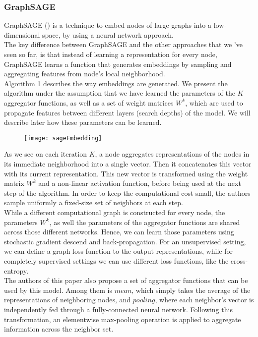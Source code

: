 \subsubsection*{GraphSAGE}
GraphSAGE (\cite{inductive}) is a technique to embed nodes of large graphs into a
low-dimensional space, by using a neural network approach.\\
The key difference between GraphSAGE and the other approaches that we 've seen
so far, is that instead of learning a representation for every node, GraphSAGE
learns a function that generates embeddings by sampling and aggregating features
from node's local neighborhood.\\
 Algorithm 1 describes the way
embeddings are generated. We present the algorithm under the assumption that
we have learned the parameters of the $K$ aggregator functions, as well as a
set of weight matrices $W^k$, which are used to propagate features between
different layers (search depths) of the model. We will describe later how these
parameters can be learned.
\begin{figure}[h!tb]
\texttt{[image: sageEmbedding]}
\label{algo}
\end{figure}
As we see on each iteration $K$, a node aggregates representations of the nodes
in its immediate neighborhood into a single vector. Then it concatenates this
vector with its current representation. This new vector is transformed using the weight matrix
$W^k$ and a non-linear activation function, before being used at the next step
of the algorithm. In order to keep the computational cost small, the authors
sample uniformly a fixed-size set of neighbors at each step.\\
 While a different computational graph is
constructed for every node, the parameters $W^k$, as well the parameters of the
aggregator functions are shared across those different networks. Hence, we can
learn those parameters using stochastic gradient descend and back-propagation.
For an unsupervised setting, we can define a graph-loss function to the output
representations, while for completely supervised settings we can use different
loss functions, like the cross-entropy.\\
 The authors of this paper also propose a set of
aggregator functions that can be used by this model. Among them is $mean$, which
simply takes the average of the representations of neighboring nodes, and
$pooling$, where each neighbor's vector is independently fed through a
fully-connected neural network. Following this transformation, an elementwise
max-pooling operation is applied to aggregate information across the neighbor
set.
